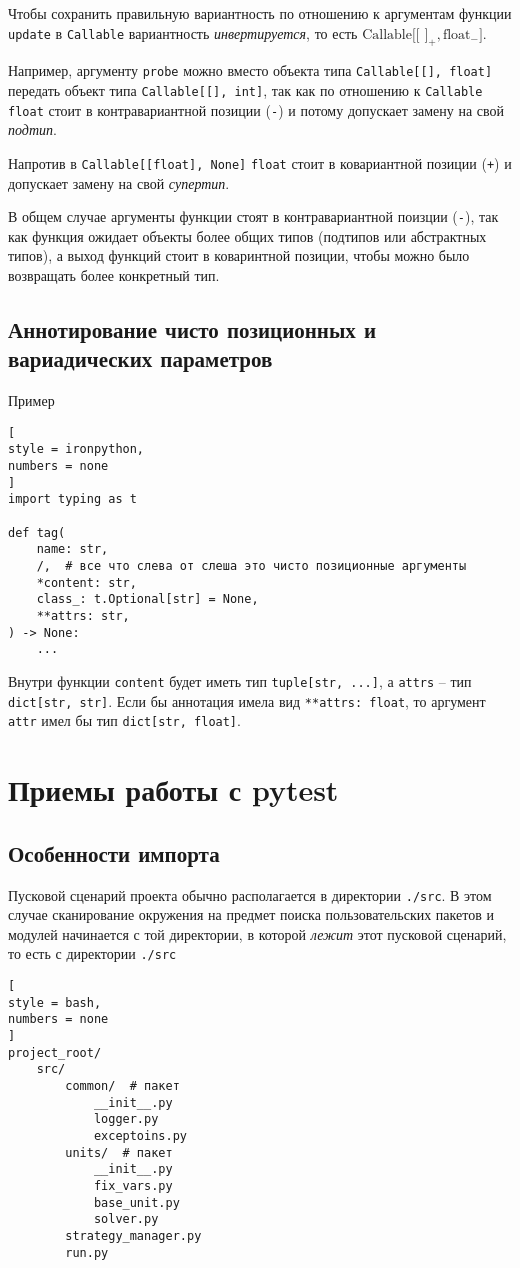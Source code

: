 \documentclass[%
	11pt,
	a4paper,
	utf8,
		]{article}
\begin{document}
Чтобы сохранить правильную вариантность по отношению к аргументам функции \verb*|update| в \verb*|Callable| вариантность \emph{инвертируется}, то есть $\text{Callable[[\ ]}_+, \text{float}_{-}]$.

Например, аргументу \verb*|probe| можно вместо объекта типа \verb|Callable[[], float]| передать объект типа \verb|Callable[[], int]|, так как по отношению к \verb*|Callable| \verb*|float| стоит в контравариантной позиции (\texttt{-}) и потому допускает замену на свой \emph{подтип}.

Напротив в \verb|Callable[[float], None]| \verb*|float| стоит в ковариантной позиции (\texttt{+}) и допускает замену на свой \emph{супертип}.

В общем случае аргументы функции стоят в контравариантной поизции (\texttt{-}), так как функция ожидает объекты более общих типов (подтипов или абстрактных типов), а выход функций стоит в коваринтной позиции, чтобы можно было возвращать более конкретный тип.

\subsection{Аннотирование чисто позиционных и вариадических параметров}

Пример
\begin{lstlisting}[
style = ironpython,
numbers = none
]
import typing as t

def tag(
    name: str,
    /,  # все что слева от слеша это чисто позиционные аргументы
    *content: str,
    class_: t.Optional[str] = None,
    **attrs: str,
) -> None:
    ...
\end{lstlisting}

Внутри функции \verb*|content| будет иметь тип \verb|tuple[str, ...]|, а \verb*|attrs| -- тип \verb|dict[str, str]|. Если бы аннотация имела вид \verb*|**attrs: float|, то аргумент \verb*|attr| имел бы тип \verb|dict[str, float]|.

\section{Приемы работы с pytest}

\subsection{Особенности импорта}

Пусковой сценарий проекта обычно располагается в директории \verb|./src|. В этом случае сканирование окружения на предмет поиска пользовательских пакетов и модулей начинается с той директории, в которой \emph{лежит} этот пусковой сценарий, то есть с директории \verb|./src|
\begin{lstlisting}[
style = bash,
numbers = none
]
project_root/
    src/
        common/  # пакет
            __init__.py
            logger.py
            exceptoins.py
        units/  # пакет
            __init__.py
            fix_vars.py
            base_unit.py
            solver.py
        strategy_manager.py
        run.py
\end{lstlisting}
\end{document}
